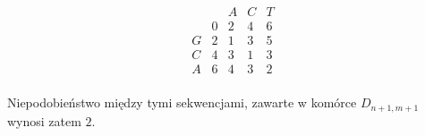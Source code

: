             \[
                \begin{matrix}
                            &        & A      & C      & T      \\
                            &      0 &      2 &      4 &      6 \\
                     G      &      2 &      1 &      3 &      5 \\
                     C      &      4 &      3 &      1 &      3 \\
                     A      &      6 &      4 &      3 &      2 \\
                \end{matrix}
            \]

            Niepodobieństwo między tymi sekwencjami, zawarte w komórce $D_{n + 1, m + 1}$ wynosi zatem $2$.

